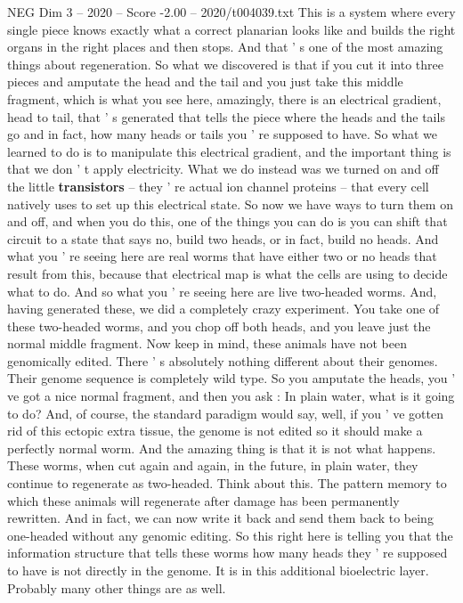 \begin{textsample}{NEG Dim 3 – 2020 – Score -2.00 – 2020/t004039.txt}
This is a system where every single piece knows exactly what a correct planarian looks like and builds the right organs in the right places and then stops.
And that ' s one of the most amazing things about regeneration.
So what we discovered is that if you cut it into three pieces and amputate the head and the tail and you just take this middle fragment, which is what you see here, amazingly, there is an electrical gradient, head to tail, that ' s generated that tells the piece where the heads and the tails go and in fact, how many heads or tails you ' re supposed to have.
So what we learned to do is to manipulate this electrical gradient, and the important thing is that we don ' t apply electricity.
What we do instead was we turned on and off the little \textbf{transistors} -- they ' re actual ion channel proteins -- that every cell natively uses to set up this electrical state.
So now we have ways to turn them on and off, and when you do this, one of the things you can do is you can shift that circuit to a state that says no, build two heads, or in fact, build no heads.
And what you ' re seeing here are real worms that have either two or no heads that result from this, because that electrical map is what the cells are using to decide what to do.
And so what you ' re seeing here are live two-headed worms.
And, having generated these, we did a completely crazy experiment.
You take one of these two-headed worms, and you chop off both heads, and you leave just the normal middle fragment.
Now keep in mind, these animals have not been genomically edited.
There ' s absolutely nothing different about their genomes.
Their genome sequence is completely wild type.
So you amputate the heads, you ' ve got a nice normal fragment, and then you ask : In plain water, what is it going to do?
And, of course, the standard paradigm would say, well, if you ' ve gotten rid of this ectopic extra tissue, the genome is not edited so it should make a perfectly normal worm.
And the amazing thing is that it is not what happens.
These worms, when cut again and again, in the future, in plain water, they continue to regenerate as two-headed.
Think about this.
The pattern memory to which these animals will regenerate after damage has been permanently rewritten.
And in fact, we can now write it back and send them back to being one-headed without any genomic editing.
So this right here is telling you that the information structure that tells these worms how many heads they ' re supposed to have is not directly in the genome.
It is in this additional bioelectric layer.
Probably many other things are as well.

\end{textsample}
